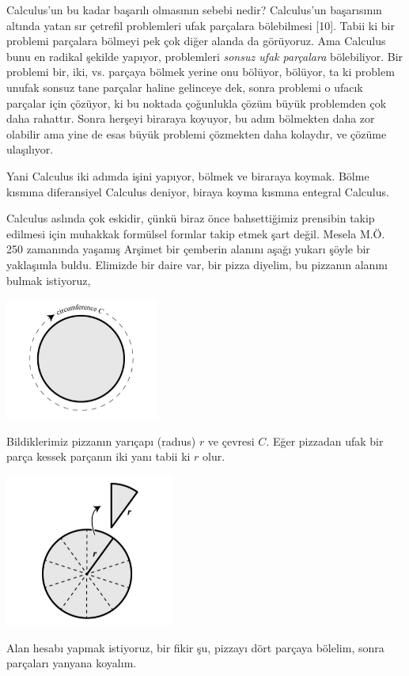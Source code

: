 \documentclass[12pt,fleqn]{article}\usepackage{../../common}
\begin{document}
Calculus'un bu kadar başarılı olmasının sebebi nedir? Calculus'un
başarısının altında yatan sır çetrefil problemleri ufak parçalara
bölebilmesi [10]. Tabii ki bir problemi parçalara bölmeyi pek çok diğer
alanda da görüyoruz. Ama Calculus bunu en radikal şekilde yapıyor,
problemleri {\em sonsuz ufak parçalara} bölebiliyor. Bir problemi bir, iki,
vs. parçaya bölmek yerine onu bölüyor, bölüyor, ta ki problem unufak sonsuz
tane parçalar haline gelinceye dek, sonra problemi o ufacık parçalar için
çözüyor, ki bu noktada çoğunlukla çözüm büyük problemden çok daha rahattır.
Sonra herşeyi biraraya koyuyor, bu adım bölmekten daha zor olabilir ama
yine de esas büyük problemi çözmekten daha kolaydır, ve çözüme ulaşılıyor.

Yani Calculus iki adımda işini yapıyor, bölmek ve biraraya koymak. Bölme
kısmına diferansiyel Calculus deniyor, biraya koyma kısmına entegral
Calculus.

Calculus aslında çok eskidir, çünkü biraz önce bahsettiğimiz prensibin
takip edilmesi için muhakkak formülsel formlar takip etmek şart
değil. Mesela M.Ö. 250 zamanında yaşamış Arşimet bir çemberin alanını aşağı
yukarı şöyle bir yaklaşımla buldu. Elimizde bir daire var, bir pizza
diyelim, bu pizzanın alanını bulmak istiyoruz,

\includegraphics[height=4cm]{circ_1.png}

Bildiklerimiz pizzanın yarıçapı (radıus) $r$ ve çevresi $C$. Eğer pizzadan
ufak bir parça kessek parçanın iki yanı tabii ki $r$ olur.

\includegraphics[height=5cm]{circ_2.png}

Alan hesabı yapmak istiyoruz, bir fikir şu, pizzayı dört parçaya bölelim,
sonra parçaları yanyana koyalım.
\end{document}
